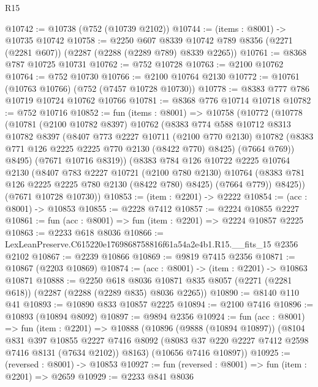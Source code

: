 \begin{lexlean}{R15}
\begin{coremodule}
@10742 := @10738 (@752 (@10739 @2102))
@10744 := (items : @8001) -> @10735 @10742
@10758 := @2250
    @607
    @8339
    @10742
    @789
    @8356
    (@2271 (@2281 @607))
    (@2287 (@2288 (@2289 @789) @8339 @2265))
@10761 := @8368 @787 @10725 @10731
@10762 := @752 @10728
@10763 := @2100 @10762
@10764 := @752 @10730
@10766 := @2100 @10764 @2130
@10772 := @10761 (@10763 @10766) (@752 (@7457 @10728 @10730))
@10778 := @8383 @777 @786 @10719 @10724 @10762 @10766
@10781 := @8368 @776 @10714 @10718
@10782 := @752 @10716
@10852 := fun (items : @8001) =>
  @10758
    (@10772
      (@10778
        (@10781
          (@2100 @10782 @8397)
          @10762
          (@8383
            @774
            @588
            @10712
            @8313
            @10782
            @8397
            (@8407
              @773
              @2227
              @10711
              (@2100 @770 @2130)
              @10782
              (@8383 @771 @126 @2225 @2225 @770 @2130 (@8422 @770) @8425)
              (@7664 @769))
            @8495)
          (@7671 @10716 @8319))
        (@8383
          @784
          @126
          @10722
          @2225
          @10764
          @2130
          (@8407
            @783
            @2227
            @10721
            (@2100 @780 @2130)
            @10764
            (@8383 @781 @126 @2225 @2225 @780 @2130 (@8422 @780) @8425)
            (@7664 @779))
          @8425))
      (@7671 @10728 @10730))
@10853 := (item : @2201) -> @2222
@10854 := (acc : @8001) -> @10853
@10855 := @2228 @7412
@10857 := @2224 @10855 @2227
@10861 := fun (acc : @8001) => fun (item : @2201) => @2224 @10857 @2225
@10863 := @2233 @618 @8036
@10866 := LexLeanPreserve.C615220e1769868758816f61a54a2e4b1.R15.__fits_15 @2356 @2102
@10867 := @2239 @10866
@10869 := @9819 @7415 @2356
@10871 := @10867 (@2203 @10869)
@10874 := (acc : @8001) -> (item : @2201) -> @10863 @10871
@10888 := @2250
    @618
    @8036
    @10871
    @835
    @8057
    (@2271 (@2281 @618))
    (@2287 (@2288 (@2289 @835) @8036 @2265))
@10890 := @8140 @110 @41
@10893 := @10890 @833 @10857 @2225
@10894 := @2100 @7416
@10896 := @10893 (@10894 @8092)
@10897 := @9894 @2356
@10924 := fun (acc : @8001) =>
  fun (item : @2201) =>
  @10888
    (@10896
      (@9888 (@10894 @10897))
      (@8104
        @831
        @397
        @10855
        @2227
        @7416
        @8092
        (@8083 @37 @220 @2227 @7412 @2598 @7416 @8131 (@7634 @2102))
        @8163)
      (@10656 @7416 @10897))
@10925 := (reversed : @8001) -> @10853
@10927 := fun (reversed : @8001) => fun (item : @2201) => @2659
@10929 := @2233 @841 @8036

\end{coremodule}
\end{lexlean}
